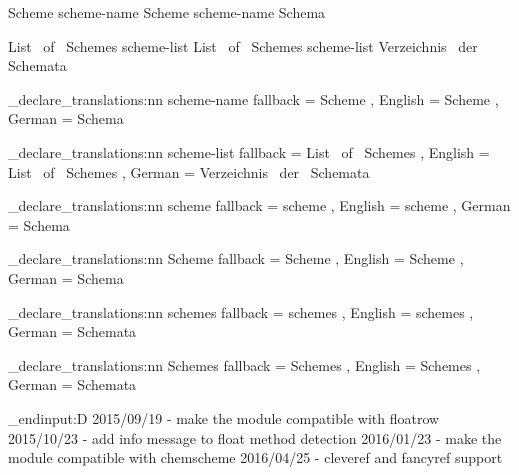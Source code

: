  {Scheme}
 {scheme-name} {Scheme}
  {scheme-name} {Schema}

 {List~ of~ Schemes}
 {scheme-list} {List~ of~ Schemes}
  {scheme-list} {Verzeichnis~ der~ Schemata}
\EndChemCompatibility

\chemmacros_declare_translations:nn {scheme-name}
  {
    fallback = Scheme ,
    English  = Scheme ,
    German   = Schema
  }

\chemmacros_declare_translations:nn {scheme-list}
  {
    fallback = List~ of~ Schemes ,
    English  = List~ of~ Schemes ,
    German   = Verzeichnis~ der~ Schemata
  }

\chemmacros_declare_translations:nn {scheme}
  {
    fallback = scheme ,
    English  = scheme ,
    German   = Schema
  }

\chemmacros_declare_translations:nn {Scheme}
  {
    fallback = Scheme ,
    English  = Scheme ,
    German   = Schema
  }

\chemmacros_declare_translations:nn {schemes}
  {
    fallback = schemes ,
    English  = schemes ,
    German   = Schemata
  }

\chemmacros_declare_translations:nn {Schemes}
  {
    fallback = Schemes ,
    English  = Schemes ,
    German   = Schemata
  }
\EndChemCompatibility

\tex_endinput:D
2015/09/19 - make the module compatible with floatrow
2015/10/23 - add info message to float method detection
2016/01/23 - make the module compatible with chemscheme
2016/04/25 - cleveref and fancyref support

